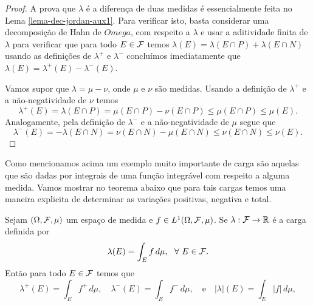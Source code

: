 \begin{proof}
A prova que $\lambda$ é a diferença de duas medidas 
é essencialmente feita no Lema \ref{lema-dec-jordan-aux1}.
Para verificar isto, basta considerar uma decomposição de 
Hahn de $Omega$, com respeito a $\lambda$ e usar a 
aditividade finita de $\lambda$ para verificar que 
para todo $E\in\mathcal{F}$ temos 
$\lambda(E) = \lambda(E\cap P)+\lambda(E\cap N)$
usando as definições de $\lambda^+$ e $\lambda^-$
concluímos imediatamente que $\lambda(E) = \lambda^+(E)-\lambda^-(E)$.

Vamos supor que $\lambda = \mu-\nu$, onde $\mu$ e $\nu$ são medidas.
Usando a definição de $\lambda^+$ e a não-negatividade de $\nu$ 
temos
\[ 
\lambda^+(E)
=
\lambda(E\cap P)
=
\mu(E\cap P)-\nu(E\cap P)
\leq
\mu(E\cap P)
\leq 
\mu(E).
\]
Analogamente, pela definição de 
$\lambda^-$ e a não-negatividade de $\mu$
segue que 
\[ 
\lambda^-(E)
=
-\lambda(E\cap N)
=
\nu(E\cap N)-\mu(E\cap N)
\leq
\nu(E\cap N)
\leq 
\nu(E).
\] 
 
\end{proof}






Como mencionamos acima um exemplo muito importante 
de carga são aquelas que são dadas por integrais
de uma função integrável com respeito a alguma medida.
Vamos mostrar no teorema abaixo que para tais cargas
temos uma maneira explicita de determinar as variações
positivas, negativa e total.


\begin{teorema}
Sejam $(\Omega,\mathcal{F},\mu)$ um espaço de medida e 
$f\in L^1(\Omega,\mathcal{F},\mu)$. Se $\lambda:\mathcal{F}\to\mathbb{R}$
é a carga definida por 
\[
\lambda(E)
=
\int_{E} f\, d\mu,
\ \ \forall \ E\in\mathcal{F}.
\]
Então para todo $E\in\mathcal{F}$ temos que  
\[
\lambda^+(E)
=
\int_{E} f^+\, d\mu,
\quad
%
\lambda^{-}(E)
=
\int_{E} f^{-}\, d\mu,
\quad \text{e}\quad
|\lambda|(E)
=
\int_{E} |f|\, d\mu,
\]
\end{teorema}
